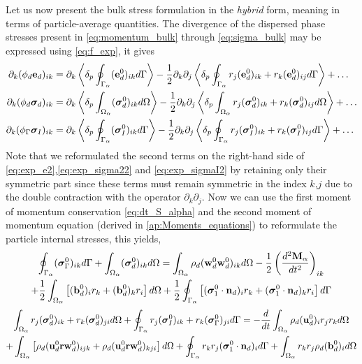 Let us now present the bulk stress formulation in the \textit{hybrid} form, meaning in terms of particle-average quantities.  
The divergence of the dispersed phase stresses present in \ref{eq:momentum_bulk} through \ref{eq:sigma_bulk} may be expressed using \ref{eq:f_exp}, it gives
\begin{align}
    \label{eq:exp_e2}
    \partial_k (\phi_d \textbf{e}_d)_{ik} 
    &=  \partial_k\pSavg{ (\textbf e_d^0)_{ik} }
        -\frac{1}{2} \partial_k\partial_j \pSavg{ r_j (\textbf e_d^0)_{ik} +r_k (\textbf e_d^0)_{ij} }
        + \ldots  \\
    \label{eq:exp_sigma22}
    \partial_k (\phi_d \bm\sigma_d)_{ik}
    &=  \partial_k\pOavg{ (\bm\sigma_d^0)_{ik}}
    -\frac{1}{2} \partial_k\partial_j
    \pOavg{ r_j(\bm\sigma^0_d)_{ik} + r_k(\bm\sigma^0_d)_{ij}}
    + \ldots  \\
    \label{eq:exp_sigmaI2}
    \partial_k (\phi_\Gamma \bm\sigma_I)_{ik} 
    &=  \partial_k\pSavg{ (\bm\sigma_I^0)_{ik} }
        -\frac{1}{2} \partial_k\partial_j \pSavg{ r_j (\bm\sigma_I^0)_{ik} +r_k (\bm\sigma_I^0)_{ij} }
        + \ldots  
\end{align}
Note that we reformulated the second terms on the right-hand side of \ref{eq:exp_e2},\ref{eq:exp_sigma22} and \ref{eq:exp_sigmaI2} by retaining only their symmetric part since these terms must remain symmetric in the index $k$,$j$ due to the double contraction with the operator $\partial_k\partial_j$. 
Now we can use the first moment of momentum conservation \eqref{eq:dt_S_alpha} and the second moment of momentum equation (derived in \ref{ap:Moments_equations}) to reformulate the particle internal stresses, this yields,  
\begin{multline}
    \intS{ (\bm{\sigma}_\Gamma^0)_{ik}}
    +\intO{ (\bm{\sigma}_d^0)_{ik}}
    = 
    \intO{ \rho_d 
    (\textbf{w}_d^0\textbf{w}_d^0  )_{ik}
    }
    -\frac{1}{2}\left(\frac{d^2 \textbf{M}_\alpha}{dt^2} \right)_{ik}\\
    +\frac{1}{2}\intO{ \left[
        (\textbf{b}_d^0)_i
        r_k 
        + (\textbf{b}_d^0)_k
        r_i
    \right]}
    +
    \frac{1}{2}\intS{ \left[
        (\bm{\sigma}_1^0 \cdot \textbf{n}_d)_i r_k
        + (\bm{\sigma}_1^0 \cdot \textbf{n}_d)_k r_i
    \right]
    }
    \label{eq:dt_P1_alpha_bis}
\end{multline}
\begin{multline}
    \intO{ r_{j}(\bm{\sigma}^0_d)_{ik}+r_{k}(\bm{\sigma}^0_d)_{ji}}
    +\intS{ r_{j}(\bm{\sigma}^0_I)_{ik}+r_{k}(\bm{\sigma}_\Gamma^0)_{ji}}
    = 
    - \ddt\intO{ \rho_d (\textbf{u}_d^0)_i r_j r_k }
    \\
    + \intO{ \left[
        \rho_d (\textbf{u}^0_d\textbf{r}\textbf{w}_d^0)_{ijk} + \rho_d (\textbf{u}^0_d\textbf{r}\textbf{w}_d^0)_{kji}
    \right]}
    +\intS{  r_{k}r_{j} (\bm{\sigma}_1^0\cdot\textbf{n}_d)_i }
    + \intO{ r_{k}r_{j}  \rho_d (\textbf{b}_d^0)_i } 
    \label{eq:dt_P2_alpha_bis}
\end{multline}
